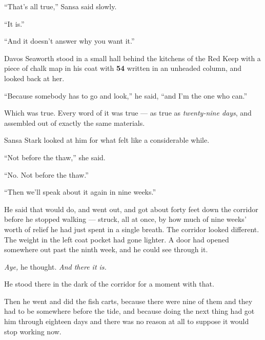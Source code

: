 “That’s all true,” Sansa said slowly.

“It is.”

“And it doesn’t answer why you want it.”

Davos Seaworth stood in a small hall behind the kitchens of the Red Keep with a piece of chalk map in his coat with \textbf{54} written in an unheaded column, and looked back at her.

“Because somebody has to go and look,” he said, “and I’m the one who can.”

Which was true. Every word of it was true — as true as \textit{twenty-nine days}, and assembled out of exactly the same materials.

Sansa Stark looked at him for what felt like a considerable while.

“Not before the thaw,” she said.

“No. Not before the thaw.”

“Then we’ll speak about it again in nine weeks.”

He said that would do, and went out, and got about forty feet down the corridor before he stopped walking — struck, all at once, by how much of nine weeks’ worth of relief he had just spent in a single breath. The corridor looked different. The weight in the left coat pocket had gone lighter. A door had opened somewhere out past the ninth week, and he could see through it.

\textit{Aye,} he thought. \textit{And there it is.}

He stood there in the dark of the corridor for a moment with that.

Then he went and did the fish carts, because there were nine of them and they had to be somewhere before the tide, and because doing the next thing had got him through eighteen days and there was no reason at all to suppose it would stop working now.